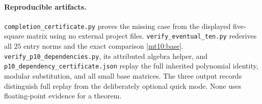 \paragraph{Reproducible artifacts.}
\texttt{completion\_certificate.py} proves the missing case from
the displayed five-square matrix using no external project files.
\texttt{verify\_eventual\_ten.py} rederives all $25$ entry norms and
the exact comparison \eqref{mt10:base}.
\texttt{verify\_p10\_dependencies.py}, its attributed algebra helper,
and \texttt{p10\_dependency\_certificate.json} replay the full inherited
polynomial identity, modular substitution, and all small base matrices.
The three output records distinguish full replay from the deliberately
optional quick mode. None uses floating-point evidence for a theorem.
